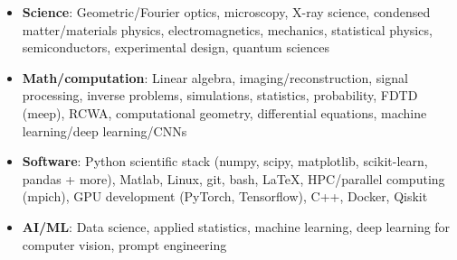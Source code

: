 \begin{itemize}
    \item \textbf{Science}: Geometric/Fourier optics, microscopy, X-ray science, condensed matter/materials physics, electromagnetics, mechanics, statistical physics, semiconductors, experimental design, quantum sciences \par
    \item \textbf{Math/computation}: Linear algebra, imaging/reconstruction, signal processing, inverse problems, simulations, statistics, probability, FDTD (meep), RCWA, computational geometry, differential equations, machine learning/deep learning/CNNs \par
    \item \textbf{Software}: Python scientific stack (numpy, scipy, matplotlib, scikit-learn, pandas + more), Matlab, Linux, git, bash, \LaTeX, HPC/parallel computing (mpich), GPU development (PyTorch, Tensorflow), C++, Docker, Qiskit \par
    \item\textbf{AI/ML}: Data science, applied statistics, machine learning, deep learning for computer vision, prompt engineering \par
\end{itemize}
